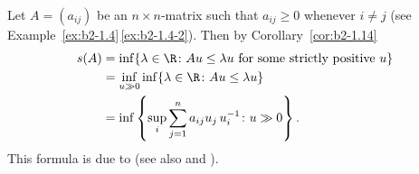 \begin{example}\label{ex:b2-1.16}
Let $A = (a_{ij})$ be an $n \times n$-matrix such that $a_{ij} \geq 0$ whenever $i \neq j$ (see Example~\ref{ex:b2-1.4}\,\ref{ex:b2-1.4-2}).
Then by Corollary~\ref{cor:b2-1.14} 
\begin{align*}
    s(A) &= \inf\{\lambda \in \R \colon Au \leq \lambda u \text{ for some strictly positive } u\} \\
    &= \inf_{u \gg 0} \inf\{\lambda \in \R \colon Au \leq \lambda u\} \\
    &= \inf\left\{\sup_{i} \sum_{j=1}^{n} a_{ij} u_{j} \, u_{i}^{-1} \colon u \gg 0\right\}.
\end{align*}
This formula is due to \textcite{collatz:1942} (see also \textcite[Chapter I, Exercise 20]{schaefer:1974} and \textcite{wielandt:1950}).
\end{example}

